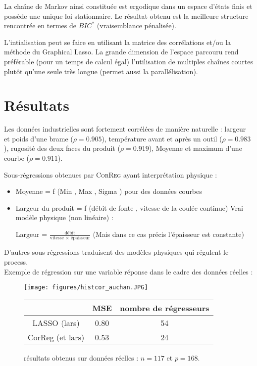 \documentclass[12pt]{article}
\begin{document}
		La chaîne de Markov ainsi constituée est ergodique dans un espace d'états finis et possède une unique loi stationnaire.
		Le résultat obtenu est la meilleure structure rencontrée en termes de $BIC^*$ (vraisemblance pénalisée). 
 
L'intialisation peut se faire en utilisant la matrice des corrélations et/ou la méthode du Graphical Lasso\cite{friedman2008sparse}.		
La grande dimension de l'espace parcouru rend préférable  (pour un temps de calcul égal) l'utilisation de multiples chaînes courtes plutôt qu'une seule très longue (permet aussi la parallélisation).

\section{Résultats}	
Les données industrielles sont fortement corrélées de manière naturelle : largeur et poids d'une brame ($\rho=0.905$), température avant et après un outil ($\rho=0.983$), rugosité des deux faces du produit ($\rho=0.919$), Moyenne et maximum d'une courbe ($\rho=0.911$).
			
Sous-régressions obtenues par \textsc{CorReg} ayant interprétation physique :
\begin{itemize}
	\item Moyenne = f (Min , Max , Sigma ) pour des données courbes
	\item Largeur du produit = f (débit de fonte , vitesse de la coulée continue)	
Vrai modèle physique (non linéaire) :

	 Largeur = $\frac{\textrm{débit}}{\textrm{vitesse } \times \textrm{ épaisseur}}$ (Mais dans ce cas précis l'épaisseur est constante)
			\end{itemize}
			
			D'autres sous-régressions traduisent des modèles physiques qui régulent le process.
\\

Exemple de régression sur une variable réponse dans le cadre des données réelles :
\begin{figure}[!h]
	\begin{minipage}[c]{.40\linewidth}
			\texttt{[image: figures/histcor\_auchan.JPG]} 
	\end{minipage} \hfill
   \begin{minipage}[c]{.52\linewidth}
		\begin{tabular}{|c|c|c|}
		\hline 
		  & MSE  & nombre de régresseurs  \\ 
		\hline
		LASSO (lars) & 0.80 & 54 \\ 
		\hline 
		CorReg (et lars) & 0.53 & 24  \\ 
		\hline 
		\end{tabular} 
   \end{minipage}
   \caption{résultats obtenus sur données réelles : $n=117$ et $p=168$.    }
\end{figure}   
	
\end{document}
